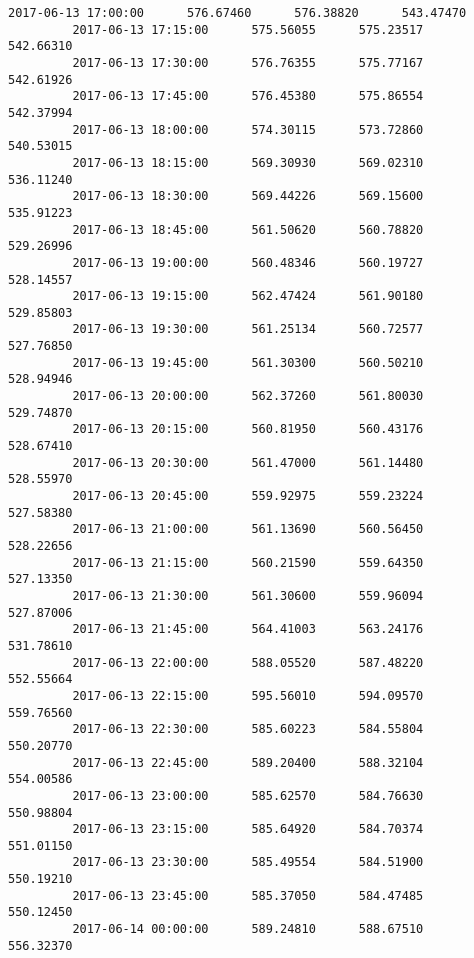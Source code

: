 \documentclass[11pt]{article}
\begin{document}
\begin{Verbatim}[commandchars=\\\{\}]
         2017-06-13 17:00:00      576.67460      576.38820      543.47470   
         2017-06-13 17:15:00      575.56055      575.23517      542.66310   
         2017-06-13 17:30:00      576.76355      575.77167      542.61926   
         2017-06-13 17:45:00      576.45380      575.86554      542.37994   
         2017-06-13 18:00:00      574.30115      573.72860      540.53015   
         2017-06-13 18:15:00      569.30930      569.02310      536.11240   
         2017-06-13 18:30:00      569.44226      569.15600      535.91223   
         2017-06-13 18:45:00      561.50620      560.78820      529.26996   
         2017-06-13 19:00:00      560.48346      560.19727      528.14557   
         2017-06-13 19:15:00      562.47424      561.90180      529.85803   
         2017-06-13 19:30:00      561.25134      560.72577      527.76850   
         2017-06-13 19:45:00      561.30300      560.50210      528.94946   
         2017-06-13 20:00:00      562.37260      561.80030      529.74870   
         2017-06-13 20:15:00      560.81950      560.43176      528.67410   
         2017-06-13 20:30:00      561.47000      561.14480      528.55970   
         2017-06-13 20:45:00      559.92975      559.23224      527.58380   
         2017-06-13 21:00:00      561.13690      560.56450      528.22656   
         2017-06-13 21:15:00      560.21590      559.64350      527.13350   
         2017-06-13 21:30:00      561.30600      559.96094      527.87006   
         2017-06-13 21:45:00      564.41003      563.24176      531.78610   
         2017-06-13 22:00:00      588.05520      587.48220      552.55664   
         2017-06-13 22:15:00      595.56010      594.09570      559.76560   
         2017-06-13 22:30:00      585.60223      584.55804      550.20770   
         2017-06-13 22:45:00      589.20400      588.32104      554.00586   
         2017-06-13 23:00:00      585.62570      584.76630      550.98804   
         2017-06-13 23:15:00      585.64920      584.70374      551.01150   
         2017-06-13 23:30:00      585.49554      584.51900      550.19210   
         2017-06-13 23:45:00      585.37050      584.47485      550.12450   
         2017-06-14 00:00:00      589.24810      588.67510      556.32370   
         

\end{Verbatim}
\end{document}
